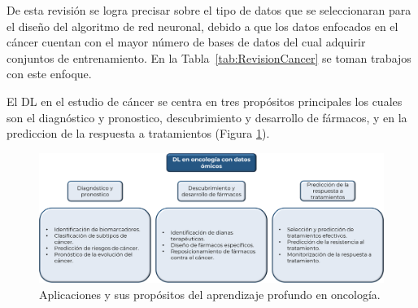 De esta revisión se logra precisar sobre el tipo de datos que se seleccionaran para el diseño del algoritmo de red neuronal, debido a que los datos enfocados en el cáncer cuentan con el mayor número de bases de datos del cual adquirir conjuntos de entrenamiento. En la Tabla~\ref{tab:RevisionCancer} se toman trabajos con este enfoque.

El DL en el estudio de cáncer se centra en tres propósitos principales los cuales son el diagnóstico y pronostico, descubrimiento y desarrollo de fármacos, y en la prediccion de la respuesta a tratamientos (Figura \ref{fig:DL_Oncologia}).

\begin{figure}[!h]
    \centering
    \includegraphics[width=.8\textwidth]{Imagenes/DL_Oncologia.png}
    \caption{Aplicaciones y sus propósitos del aprendizaje profundo en oncología.}
    \label{fig:DL_Oncologia}
\end{figure}

